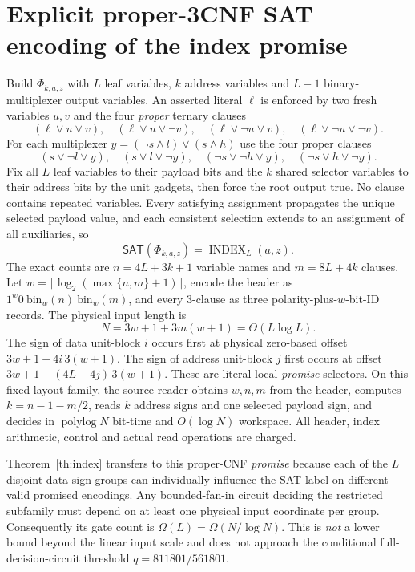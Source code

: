 \documentclass[11pt]{article}
\newcommand{\SAT}{\mathsf{SAT}}
\begin{document}
\section{Explicit proper-3CNF SAT encoding of the index promise}
Build $\Phi_{k,a,z}$ with $L$ leaf variables, $k$ address variables and $L-1$ binary-multiplexer output variables. An asserted literal $\ell$ is enforced by two fresh variables $u,v$ and the four \emph{proper} ternary clauses
\[
(\ell\vee u\vee v),\quad(\ell\vee u\vee\neg v),\quad
(\ell\vee\neg u\vee v),\quad(\ell\vee\neg u\vee\neg v).
\]
For each multiplexer $y=(\neg s\wedge l)\vee(s\wedge h)$ use the four proper clauses
\[
(s\vee\neg l\vee y),\quad(s\vee l\vee\neg y),\quad
(\neg s\vee\neg h\vee y),\quad(\neg s\vee h\vee\neg y).
\]
Fix all $L$ leaf variables to their payload bits and the $k$ shared selector variables to their address bits by the unit gadgets, then force the root output true. No clause contains repeated variables. Every satisfying assignment propagates the unique selected payload value, and each consistent selection extends to an assignment of all auxiliaries, so
\[
\boxed{\SAT(\Phi_{k,a,z})=\operatorname{INDEX}_L(a,z).}
\]
The exact counts are $n=4L+3k+1$ variable names and $m=8L+4k$ clauses. Let
$w=\lceil\log_2(\max\{n,m\}+1)\rceil$,
encode the header as $1^w0\ \mathrm{bin}_w(n)\ \mathrm{bin}_w(m)$,
and every 3-clause as three polarity-plus-$w$-bit-ID records. The physical input length is
\[
\boxed{N=3w+1+3m(w+1)=\Theta(L\log L).}
\]
The sign of data unit-block $i$ occurs first at physical zero-based offset $3w+1+4i\,3(w+1)$. The sign of address unit-block $j$ first occurs at offset $3w+1+(4L+4j)\,3(w+1)$. These are literal-local \emph{promise} selectors. On this fixed-layout family, the source reader obtains $w,n,m$ from the header, computes $k=n-1-m/2$, reads $k$ address signs and one selected payload sign, and decides in $\operatorname{polylog}N$ bit-time and $O(\log N)$ workspace. All header, index arithmetic, control and actual read operations are charged.

Theorem~\ref{th:index} transfers to this proper-CNF \emph{promise} because each of the $L$ disjoint data-sign groups can individually influence the SAT label on different valid promised encodings. Any bounded-fan-in circuit deciding the restricted subfamily must depend on at least one physical input coordinate per group. Consequently its gate count is $\Omega(L)=\Omega(N/\log N)$. This is \emph{not} a lower bound beyond the linear input scale and does not approach the conditional full-decision-circuit threshold $q=811801/561801$.
\end{document}
